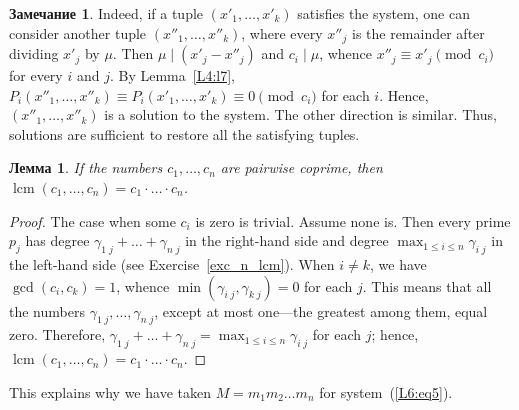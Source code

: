 \documentclass[12pt,notitlepage]{article}
\theoremstyle{plain}
\newtheorem{lemma}[thm]{Лемма}
\theoremstyle{definition}
\newtheorem{rem}[thm]{Замечание}
\theoremstyle{plain}
\newcommand{\1}{\mathbf{1}}
\newcommand{\0}{\mathbf{0}}
\newcommand{\dvd}{\mathop{\mid}}
\DeclareMathOperator{\lcm}{lcm}
\begin{document}
\begin{rem}
	Indeed, if a tuple $(x'_1, \ldots, x'_k)$ satisfies the system, one can consider another tuple $(x''_1, \ldots, x''_k)$, where every $x''_j$ is the remainder after dividing $x'_j$ by $\mu$. Then $\mu \dvd (x'_j - x''_j)$ and $c_i \dvd \mu$, whence $x''_j \equiv x'_j \pmod {c_i}$ for every $i$ and $j$. By Lemma~\ref{L4:l7}, $P_i(x''_1,\ldots, x''_k) \equiv P_i(x'_1,\ldots, x'_k) \equiv 0 \pmod {c_i}$ for each $i$. Hence, $(x''_1, \ldots, x''_k)$ is a solution to the system. The other direction is similar. Thus, solutions are sufficient to restore all the satisfying tuples.
	\begin{lemma}\label{congr:lcm}
		If the numbers $c_1, \ldots, c_n$ are pairwise coprime, then $\lcm(c_1, \ldots, c_n) = c_1 \cdot \ldots \cdot c_n$. 
	\end{lemma}
	\begin{proof}
		The case when some $c_i$ is zero is trivial. Assume none is. Then every prime $p_j$ has degree $\gamma_{1\; j} + \ldots + \gamma_{n\; j}$ in the right-hand side and degree $\max_{1 \leq i \leq n} \gamma_{i\; j}$ in the left-hand side (see Exercise~\ref{exc_n_lcm}). When $i \neq k$, we have $\gcd(c_i, c_k) = 1$, whence $\min(\gamma_{i\; j}, \gamma_{k\; j}) = 0$ for each $j$. This means that all the numbers $\gamma_{1\; j}, \ldots, \gamma_{n\; j}$, except at most one---the greatest among them, equal zero. Therefore, $\gamma_{1\; j} + \ldots + \gamma_{n\; j} = \max_{1 \leq i \leq n} \gamma_{i\; j}$ for each $j$; hence, $\lcm(c_1, \ldots, c_n) = c_1 \cdot \ldots \cdot c_n$.
	\end{proof}
	\noindent This explains why we have taken $M = m_1 m_2 \ldots m_n$ for system~(\ref{L6:eq5}).
\end{rem}
\end{document}
